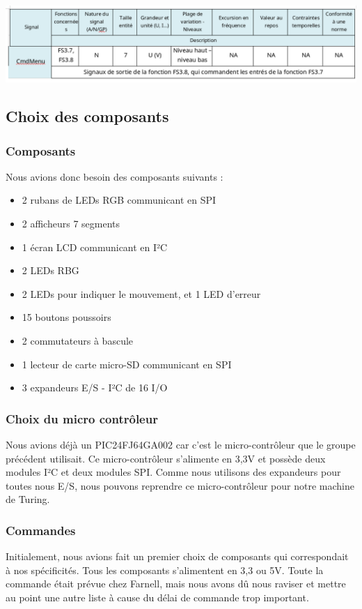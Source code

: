 \documentclass[12pt]{report}
\begin{document}
	\includegraphics[width=\textwidth]{img/s6}
	\subsection{Choix des composants}
	\subsubsection{Composants}
	Nous avions donc besoin des composants suivants :
	\begin{itemize}[label=$-$]
		\item 2 rubans de LEDs RGB communicant en SPI
		\item 2 afficheurs 7 segments
		\item 1 écran LCD communicant en I²C
		\item 2 LEDs RBG
		\item 2 LEDs pour indiquer le mouvement, et 1 LED d'erreur
		\item 15 boutons poussoirs
		\item 2 commutateurs à bascule
		\item 1 lecteur de carte micro-SD communicant en SPI
		\item 3 expandeurs E/S - I²C de 16 I/O
	\end{itemize}
	\subsubsection{Choix du micro contrôleur}
	Nous avions déjà un PIC24FJ64GA002 car c'est le micro-contrôleur que le groupe précédent utilisait. Ce micro-contrôleur s'alimente en 3,3V et possède deux modules I²C et deux modules SPI. Comme nous utilisons des expandeurs pour toutes nous E/S, nous pouvons reprendre ce micro-contrôleur pour notre machine de Turing.\\
	\subsubsection{Commandes}
	Initialement, nous avions fait un premier choix de composants qui correspondait à nos spécificités. Tous les composants s'alimentent en 3,3 ou 5V. Toute la commande était prévue chez Farnell, mais nous avons dû nous raviser et mettre au point une autre liste à cause du délai de commande trop important.\\
\end{document}
